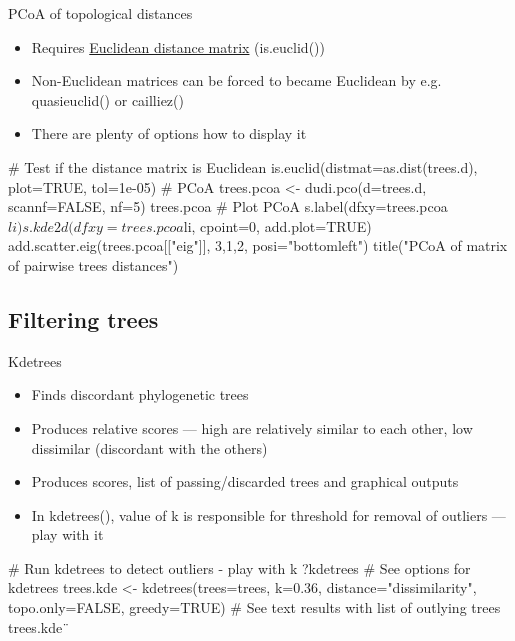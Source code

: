 \documentclass[compress, ucs, xelatex, 11pt, xcolor=x11names, aspectratio=169,
	hyperref={
		bookmarks=true,
		unicode=true,
		colorlinks=true,
		pdftitle={HybSeq course},
		plainpages=false,
		pdfauthor={Vojtech Zeisek},
		pdfsubject={Practical processing of HybSeq target enrichment sequencing data on computing grids like MetaCentrum},
		pdfcreator={XeLaTeX},
		pdfkeywords={BASH, command line, GNU, HybSeq, Linux, MetaCentrum, sequencing shell, target enrichment},
		linkcolor=Turquoise4, %
		anchorcolor=DodgerBlue4, %
		citecolor=DodgerBlue4, %
		filecolor=DodgerBlue4, %
		menucolor=Tan4, %
		urlcolor=DarkOliveGreen4, %
		pdftex},
	url={hyphens, lowtilde} %
	]{beamer}
\renewcommand{\texttt}[1]{\colorbox{Cornsilk2}{{\ttfamily #1}}}
\renewcommand{\alert}[1]{\textcolor{OrangeRed3}{#1}}
\begin{document}
\begin{frame}[fragile]{PCoA of topological distances}
	\begin{itemize}
		\item Requires \href{https://en.wikipedia.org/wiki/Euclidean_distance_matrix}{Euclidean distance matrix} (\texttt{is.euclid()})
		\item Non-Euclidean matrices can be forced to became Euclidean by e.g. \texttt{quasieuclid()} or \texttt{cailliez()}
		\item There are plenty of options how to display it
	\end{itemize}
	\begin{spluscode}
    # Test if the distance matrix is Euclidean
    is.euclid(distmat=as.dist(trees.d), plot=TRUE, tol=1e-05)
    # PCoA
    trees.pcoa <- dudi.pco(d=trees.d, scannf=FALSE, nf=5)
    trees.pcoa
    # Plot PCoA
    s.label(dfxy=trees.pcoa$li)
    s.kde2d(dfxy=trees.pcoa$li, cpoint=0, add.plot=TRUE)
    add.scatter.eig(trees.pcoa[["eig"]], 3,1,2, posi="bottomleft")
    title("PCoA of matrix of pairwise trees distances")
	\end{spluscode}
\end{frame}

\subsection{Filtering trees}

\begin{frame}[fragile]{Kdetrees}
	\begin{itemize}
		\item Finds discordant phylogenetic trees
		\item Produces relative scores --- high are relatively similar to each other, low dissimilar (discordant with the others)
		\item Produces scores, list of passing/discarded trees and graphical outputs
		\item In \texttt{kdetrees()}, \alert{value of \texttt{k} is responsible for threshold for removal of outliers --- play with it}
	\end{itemize}
	\begin{spluscode}
    # Run kdetrees to detect outliers - play with k
    ?kdetrees # See options for kdetrees
    trees.kde <- kdetrees(trees=trees, k=0.36, distance="dissimilarity",
      topo.only=FALSE, greedy=TRUE)
     # See text results with list of outlying trees
    trees.kde¨
	\end{spluscode}
\end{frame}
\end{document}
